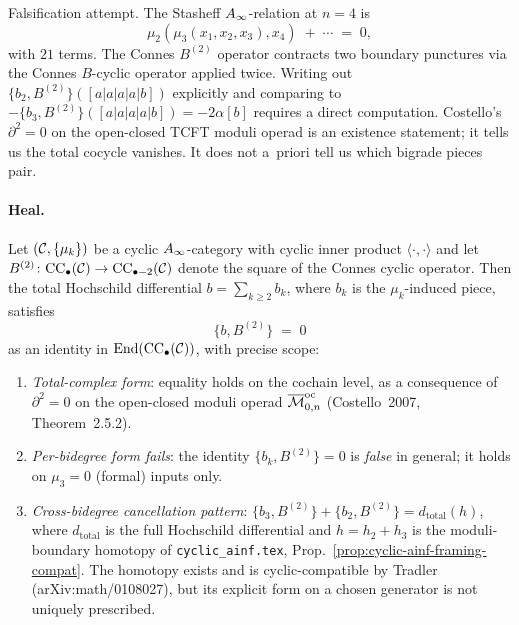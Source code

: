 Falsification attempt. The Stasheff $A_\infty$-relation at $n = 4$ is
\[
  \mu_2(\mu_3(x_1, x_2, x_3), x_4) \;+\; \cdots \;=\; 0,
\]
with $21$ terms. The Connes $B^{(2)}$ operator contracts two
boundary punctures via the Connes $B$-cyclic operator applied
twice. Writing out
$\{b_2, B^{(2)}\}([a|a|a|a|b])$ explicitly and comparing to
$-\{b_3, B^{(2)}\}([a|a|a|a|b]) = -2\alpha [b]$ requires a direct
computation. Costello's
$\partial^2 = 0$ on the open-closed TCFT moduli operad
is an existence statement; it tells us the total cocycle vanishes.
It does not a~priori tell us which bigrade pieces pair.

\paragraph{Heal.}

\begin{theorem}[$\{b, B^{(2)}\} = 0$ as a total-complex identity]
\label{thm:gelfand-obs-ainf}
\ClaimStatusDerivation{}
Let $(\mathcal{C}, \{\mu_k\})$ be a cyclic $A_\infty$-category with cyclic
inner product $\langle\cdot,\cdot\rangle$ and let
$B^{(2)} \colon \mathrm{CC}_\bullet(\mathcal{C}) \to \mathrm{CC}_{\bullet-2}(\mathcal{C})$
denote the square of the Connes cyclic operator. Then the total
Hochschild differential $b = \sum_{k \geq 2} b_k$, where $b_k$ is
the $\mu_k$-induced piece, satisfies
\begin{equation}
\label{eq:gelfand-obs-ainf}
  \{b, B^{(2)}\} \;=\; 0
\end{equation}
as an identity in $\mathrm{End}(\mathrm{CC}_\bullet(\mathcal{C}))$, with
precise scope:
\begin{enumerate}[label=\textup{(\alph*)}]
\item \emph{Total-complex form}: equality holds on the cochain
level, as a consequence of $\partial^2 = 0$ on the open-closed
moduli operad $\overline{\mathcal{M}}^{\mathrm{oc}}_{0,n}$ (Costello~2007,
Theorem~2.5.2).

\item \emph{Per-bidegree form fails}: the identity
$\{b_k, B^{(2)}\} = 0$ is \emph{false} in general; it holds on
$\mu_3 = 0$ (formal) inputs only.

\item \emph{Cross-bidegree cancellation pattern}:
$\{b_3, B^{(2)}\} + \{b_2, B^{(2)}\} = d_{\mathrm{total}}(h)$,
where $d_{\mathrm{total}}$ is the full Hochschild differential
and $h = h_2 + h_3$ is the moduli-boundary homotopy of
\texttt{cyclic\_ainf.tex}, Prop.\ \ref{prop:cyclic-ainf-framing-compat}.
The homotopy exists and is cyclic-compatible by
Tradler (arXiv:math/0108027), but its explicit form on a chosen
generator is not uniquely prescribed.
\end{enumerate}
\end{theorem}

